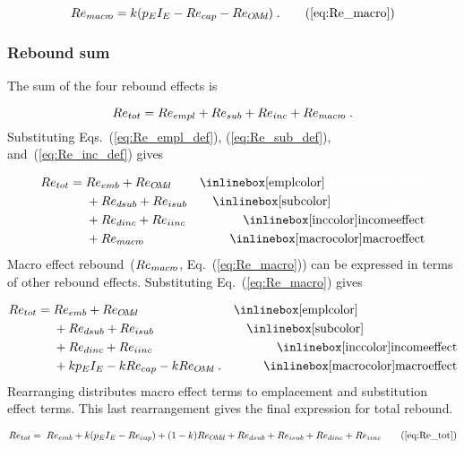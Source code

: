 \begin{equation}
  Re_{\macro} = \Remacroeqn{} \; . \tag{\ref{eq:Re_macro}}
\end{equation}


\subsubsection{Rebound sum}
\label{sec:total_rebound}

The sum of the four rebound effects is

\begin{equation}
  Re_{tot} = Re_{empl} + Re_{sub} + Re_{inc} + Re_{macr\!o} \; .
\end{equation}
%
Substituting Eqs.~(\ref{eq:Re_empl_def}), (\ref{eq:Re_sub_def}), and~(\ref{eq:Re_inc_def}) gives

\begin{align}
  Re_{tot} = \; &Re_{emb} + Re_{\omd}      & \mathrm{\empleffect} \nonumber \\
                &+ Re_{dsub} + Re_{isub}   & \mathrm{\subeffect}  \nonumber \\
                &+ Re_{dinc} + Re_{iinc}   & \mathrm{\inceffect}  \nonumber \\
                &+ Re_{\macro}      & \mathrm{\macroeffect}
\end{align}
%
Macro effect rebound~($Re_{macr\!o}$, Eq.~(\ref{eq:Re_macro}))
can be expressed in terms of other rebound effects.
Substituting Eq.~(\ref{eq:Re_macro}) gives

\begin{align}
  Re_{tot} = \; &Re_{emb} + Re_{\omd}      & \mathrm{\empleffect}       \nonumber \\
                &+ Re_{dsub} + Re_{isub}   & \mathrm{\subeffect}        \nonumber \\
                &+ Re_{dinc} + Re_{iinc}   & \mathrm{\inceffect}        \nonumber \\
                &+ k p_E I_E - k Re_{cap} - k Re_{\omd} \; .  & \mathrm{\macroeffect}
\end{align}
%
Rearranging distributes macro effect terms
to emplacement and substitution effect terms.
This last rearrangement gives the final expression for total rebound.

\begin{align}
  Re_{tot} = \; \Retoteqn{} \tag{\ref{eq:Re_tot}}
\end{align}

